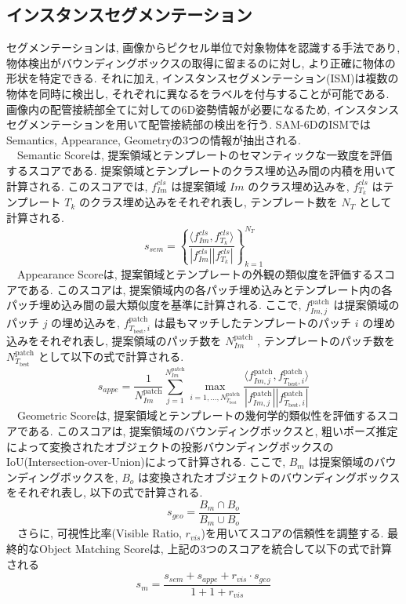 \subsection{インスタンスセグメンテーション}
セグメンテーションは, 画像からピクセル単位で対象物体を認識する手法であり, 物体検出がバウンディングボックスの取得に留まるのに対し, より正確に物体の形状を特定できる. 
それに加え, インスタンスセグメンテーション(ISM)は複数の物体を同時に検出し, それぞれに異なるをラベルを付与することが可能である. 
画像内の配管接続部全てに対しての6D姿勢情報が必要になるため, インスタンスセグメンテーションを用いて配管接続部の検出を行う. 
SAM-6DのISMではSemantics, Appearance, Geometryの3つの情報が抽出される. \\
　Semantic Scoreは, 提案領域とテンプレートのセマンティックな一致度を評価するスコアである. 
提案領域とテンプレートのクラス埋め込み間の内積を用いて計算される. 
このスコアでは, $f^{cls}_{Im}$ は提案領域 $Im$ のクラス埋め込みを, $f^{cls}_{T_k}$ はテンプレート $T_k$ のクラス埋め込みをそれぞれ表し, テンプレート数を $N_T$ として計算される. 
\[
s_{sem} = \left\{ \frac{\langle f^{cls}_{Im}, f^{cls}_{T_k} \rangle}{|f^{cls}_{Im}||f^{cls}_{T_k}|} \right\}_{k=1}^{N_T}
\]
　Appearance Scoreは, 提案領域とテンプレートの外観の類似度を評価するスコアである. 
このスコアは, 提案領域内の各パッチ埋め込みとテンプレート内の各パッチ埋め込み間の最大類似度を基準に計算される. 
ここで, $f^{\text{patch}}_{Im,j}$ は提案領域のパッチ $j$ の埋め込みを, $f^{\text{patch}}_{T_{\text{best}},i}$ は最もマッチしたテンプレートのパッチ $i$ の埋め込みをそれぞれ表し, 提案領域のパッチ数を $N_{Im}^{\text{patch}}$ , テンプレートのパッチ数を $N_{T_{\text{best}}}^{\text{patch}}$ として以下の式で計算される. 
\[
s_{appe} = \frac{1}{N_{Im}^{\text{patch}}} \sum_{j=1}^{N_{Im}^{\text{patch}}} \max_{i=1, \dots, N_{T_{\text{best}}}^{\text{patch}}} \frac{\langle f^{\text{patch}}_{Im,j}, f^{\text{patch}}_{T_{\text{best}},i} \rangle}{|f^{\text{patch}}_{Im,j}| |f^{\text{patch}}_{T_{\text{best}},i}|}
\]
　Geometric Scoreは, 提案領域とテンプレートの幾何学的類似性を評価するスコアである. 
このスコアは, 提案領域のバウンディングボックスと, 粗いポーズ推定によって変換されたオブジェクトの投影バウンディングボックスのIoU(Intersection-over-Union)によって計算される. 
ここで, $B_m$ は提案領域のバウンディングボックスを, $B_o$ は変換されたオブジェクトのバウンディングボックスをそれぞれ表し, 以下の式で計算される. 
\[
s_{geo} = \frac{B_m \cap B_o}{B_m \cup B_o}
\]
　さらに, 可視性比率(Visible Ratio, $r_{vis}$)を用いてスコアの信頼性を調整する. 
最終的なObject Matching Scoreは, 上記の3つのスコアを統合して以下の式で計算される
\[
s_m = \frac{s_{sem} + s_{appe} + r_{vis} \cdot s_{geo}}{1 + 1 + r_{vis}}
\]


